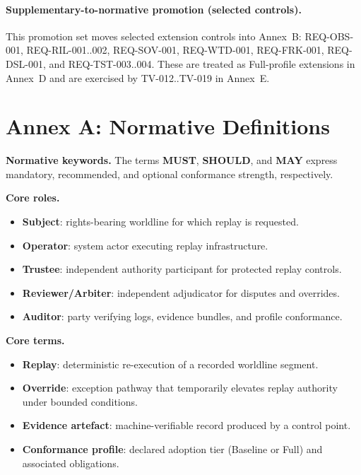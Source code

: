 \documentclass[11pt]{article}
\theoremstyle{definition}
\theoremstyle{plain}
\theoremstyle{remark}
\begin{document}
\paragraph{Supplementary-to-normative promotion (selected controls).}
This promotion set moves selected extension controls into Annex~B:
REQ-OBS-001,
REQ-RIL-001..002,
REQ-SOV-001,
REQ-WTD-001,
REQ-FRK-001,
REQ-DSL-001,
and REQ-TST-003..004.
These are treated as Full-profile extensions in Annex~D and are exercised by TV-012..TV-019 in Annex~E.

\appendix

\section{Annex A: Normative Definitions}
\label{ann:def}

\textbf{Normative keywords.}
The terms \textbf{MUST}, \textbf{SHOULD}, and \textbf{MAY} express mandatory, recommended, and optional
conformance strength, respectively.

\textbf{Core roles.}
\begin{itemize}[leftmargin=*]
  \item \textbf{Subject}: rights-bearing worldline for which replay is requested.
  \item \textbf{Operator}: system actor executing replay infrastructure.
  \item \textbf{Trustee}: independent authority participant for protected replay controls.
  \item \textbf{Reviewer/Arbiter}: independent adjudicator for disputes and overrides.
  \item \textbf{Auditor}: party verifying logs, evidence bundles, and profile conformance.
\end{itemize}

\textbf{Core terms.}
\begin{itemize}[leftmargin=*]
  \item \textbf{Replay}: deterministic re-execution of a recorded worldline segment.
  \item \textbf{Override}: exception pathway that temporarily elevates replay authority under bounded conditions.
  \item \textbf{Evidence artefact}: machine-verifiable record produced by a control point.
  \item \textbf{Conformance profile}: declared adoption tier (Baseline or Full) and associated obligations.
\end{itemize}
\end{document}
